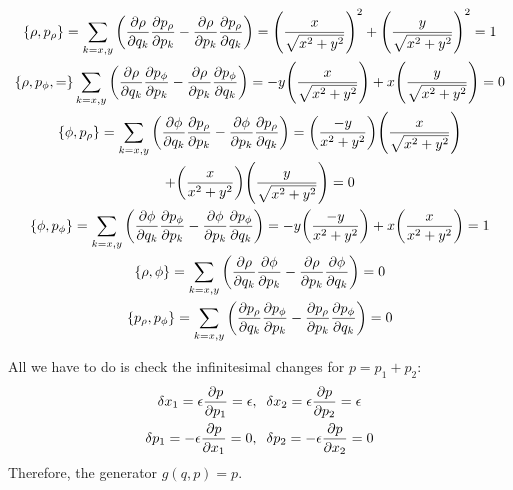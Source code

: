 \documentclass{report}
\theoremstyle{definition}
\begin{document}
\begin{chapter2}\label{prob: 13}
	\begin{gather*}
			\acomm{\rho}{p_{\rho}} = \sum_{k = x, y} \pqty{\pdv{\rho}{q_k}\pdv{p_{\rho}}{p_k} - \pdv{\rho}{p_k}\pdv{p_{\rho}}{q_k}} = \pqty{\frac{x}{\sqrt{x^2 + y ^2}}}^2 + \pqty{\frac{y}{\sqrt{x^2 + y ^2}}}^2 = 1 \\
			\acomm{\rho, p_{\phi}} = \sum_{k = x, y} \pqty{\pdv{\rho}{q_k}\pdv{p_{\phi}}{p_k} - \pdv{\rho}{p_k}\pdv{p_{\phi}}{q_k}} = -y\pqty{\frac{x}{\sqrt{x^2 + y ^2}}} + x\pqty{\frac{y}{\sqrt{x^2 + y ^2}}} = 0 \\
			\acomm{\phi}{p_{\rho}} = \sum_{k = x, y} \pqty{\pdv{\phi}{q_k}\pdv{p_{\rho}}{p_k} - \pdv{\phi}{p_k}\pdv{p_{\rho}}{q_k}} = \pqty{\frac{-y}{x^2 + y ^2}}\pqty{\frac{x}{\sqrt{x^2 + y ^2}}} \notag\\
			+ \pqty{\frac{x}{x^2 + y ^2}}\pqty{\frac{y}{\sqrt{x^2 + y ^2}}} = 0 \\
			\acomm{\phi}{p_{\phi}} = \sum_{k = x, y} \pqty{\pdv{\phi}{q_k}\pdv{p_{\phi}}{p_k} - \pdv{\phi}{p_k}\pdv{p_{\phi}}{q_k}} = -y\pqty{\frac{-y}{x^2 + y ^2}} + x\pqty{\frac{x}{x^2 + y ^2}} = 1 \\
			\acomm{\rho}{\phi} = \sum_{k = x, y} \pqty{\pdv{\rho}{q_k}\pdv{\phi}{p_k} - \pdv{\rho}{p_k}\pdv{\phi}{q_k}} = 0 \\
			\acomm{p_{\rho}}{p_{\phi}} = \sum_{k = x, y} \pqty{\pdv{p_{\rho}}{q_k}\pdv{p_{\phi}}{p_k} - \pdv{p_{\rho}}{p_k}\pdv{p_{\phi}}{q_k}} = 0
		\end{gather*}
\end{chapter2}

\begin{chapter2}\label{prob: 14}
	
\end{chapter2}

\begin{chapter2}\label{prob: 15}
	
\end{chapter2}

\begin{chapter2}\label{prob: 16}
	
\end{chapter2}

\begin{chapter2}\label{prob: 17}
	All we have to do is check the infinitesimal changes for $p = p_1 + p_2$:
		\begin{gather*}
			\delta x_1 = \epsilon \pdv{p}{p_1} = \epsilon, \;\; \delta x_2 = \epsilon \pdv{p}{p_2} = \epsilon \\
			\delta p_1 = -\epsilon \pdv{p}{x_1} = 0, \;\; \delta p_2 = -\epsilon \pdv{p}{x_2} = 0
		\end{gather*}
		Therefore, the generator $g(q,p) = p$.
\end{chapter2}
\end{document}
